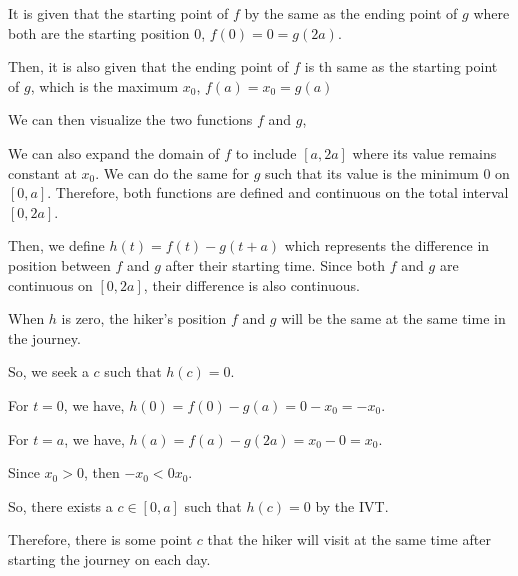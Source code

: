\documentclass[../m134a-hw2.tex]{subfiles}
\begin{document}
It is given that the starting point of $f$ by the same as the ending point of $g$ where both are the starting position 0, $f(0)=0=g(2a)$.

Then, it is also given that the ending point of $f$ is th same as the starting point of $g$, which is the maximum $x_0$, $f(a)=x_0=g(a)$

We can then visualize the two functions $f$ and $g$,

\begin{figure*}[ht]
\centering
{}
\end{figure*}

\begin{comment}
THE INTERMEDIATE-VALUE THEOREM
If f is continuous on [a, b] and K is any number between f (a) and f (b), then
there is at least one number c in the interval (a, b) such that f (c) = K.
\end{comment}

We can also expand the domain of $f$ to include $[a,2a]$ where its value remains constant at $x_0$.
We can do the same for $g$ such that its value is the minimum 0 on $[0,a]$. Therefore, both functions are defined and continuous on the total interval $[0,2a]$.

Then, we define $h(t) = f(t) - g(t + a)$ which represents the difference in position between $f$ and $g$ after their starting time. Since both $f$ and $g$ are continuous on $[0,2a]$, their difference is also continuous.

When $h$ is zero, the hiker's position $f$ and $g$ will be the same at the same time in the journey.

So, we seek a $c$ such that $h(c) = 0$.

For $t = 0$, we have, $h(0) = f(0) - g(a) = 0 - x_0 =-x_0$.

For $t = a$, we have, $h(a) = f(a) - g(2a) = x_0 - 0 = x_0$.

Since $x_0 > 0$, then $-x_0 < 0 x_0$.

So, there exists a $c \in [0,a]$ such that $h(c) = 0$ by the IVT.

Therefore, there is some point $c$ that the hiker will visit at the same time after starting the journey on each day.
\end{document}
